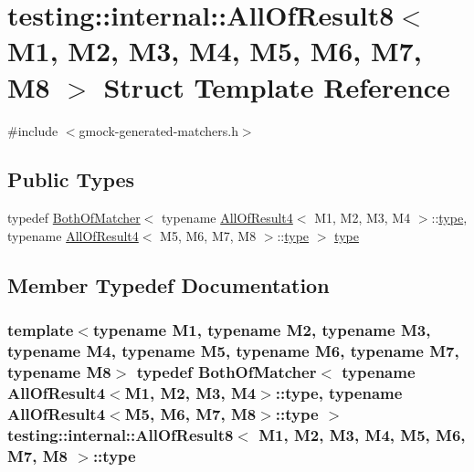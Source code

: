 \hypertarget{structtesting_1_1internal_1_1_all_of_result8}{}\section{testing\+:\+:internal\+:\+:All\+Of\+Result8$<$ M1, M2, M3, M4, M5, M6, M7, M8 $>$ Struct Template Reference}
\label{structtesting_1_1internal_1_1_all_of_result8}


{\ttfamily \#include $<$gmock-\/generated-\/matchers.\+h$>$}

\subsection*{Public Types}
\begin{DoxyCompactItemize}
\item 
typedef \hyperlink{classtesting_1_1internal_1_1_both_of_matcher}{Both\+Of\+Matcher}$<$ typename \hyperlink{structtesting_1_1internal_1_1_all_of_result4}{All\+Of\+Result4}$<$ M1, M2, M3, M4 $>$\+::\hyperlink{structtesting_1_1internal_1_1_all_of_result8_a7103892a28c35221b9e62e871c577727}{type}, typename \hyperlink{structtesting_1_1internal_1_1_all_of_result4}{All\+Of\+Result4}$<$ M5, M6, M7, M8 $>$\+::\hyperlink{structtesting_1_1internal_1_1_all_of_result8_a7103892a28c35221b9e62e871c577727}{type} $>$ \hyperlink{structtesting_1_1internal_1_1_all_of_result8_a7103892a28c35221b9e62e871c577727}{type}
\end{DoxyCompactItemize}


\subsection{Member Typedef Documentation}
\subsubsection[{\texorpdfstring{type}{type}}]{\setlength{\rightskip}{0pt plus 5cm}template$<$typename M1, typename M2, typename M3, typename M4, typename M5, typename M6, typename M7, typename M8$>$ typedef {\bf Both\+Of\+Matcher}$<$ typename {\bf All\+Of\+Result4}$<$M1, M2, M3, M4$>$\+::{\bf type}, typename {\bf All\+Of\+Result4}$<$M5, M6, M7, M8$>$\+::{\bf type} $>$ {\bf testing\+::internal\+::\+All\+Of\+Result8}$<$ M1, M2, M3, M4, M5, M6, M7, M8 $>$\+::{\bf type}}\hypertarget{structtesting_1_1internal_1_1_all_of_result8_a7103892a28c35221b9e62e871c577727}{}\label{structtesting_1_1internal_1_1_all_of_result8_a7103892a28c35221b9e62e871c577727}


